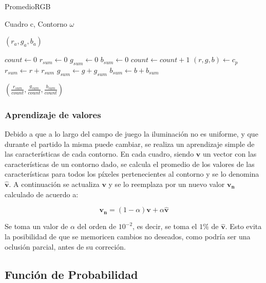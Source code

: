 \begin{algorithm}
    \caption{PromedioRGB}
    \label{alg:carac-rgb}
    \begin{algorithmic}
    \Require\hspace{\algorithmicindent}\hspace{\algorithmicindent}Cuadro c, Contorno $\omega$

    \Ensure\hspace{\algorithmicindent}\hspace{0.23cm} $(r_a, g_a, b_a)$
    \State

    \State $count \gets 0$
    \State $r_{sum} \gets 0$
    \State $g_{sum} \gets 0$
    \State $b_{sum} \gets 0$
        \State $count \gets count + 1$
        \State $(r, g, b) \gets c_{p}$
        \State $r_{sum} \gets r + r_{sum}$
        \State $g_{sum} \gets g + g_{sum}$
        \State $b_{sum} \gets b + b_{sum}$
    \EndFor

    \State \Return $ (\frac{r_{sum}}{count}, \frac{g_{sum}}{count}, \frac{b_{sum}}{count}) $
    \end{algorithmic}
\end{algorithm}


\subsubsection{Aprendizaje de valores}

Debido a que a lo largo del campo de juego la iluminación no es uniforme, y que
durante el partido la misma puede cambiar, se realiza un aprendizaje simple
de las características de cada contorno. En cada cuadro, siendo $\mathbf{v}$ un
vector con las características de un contorno dado, se calcula el promedio de
los valores de las características para todos los píxeles pertenecientes al
contorno y se lo denomina $\hat{\mathbf{v}}$. A continuación se actualiza
$\mathbf{v}$ y se lo reemplaza por un nuevo valor $\mathbf{v_n}$ calculado de
acuerdo a:

\[
  \mathbf{v_n} = \left(1-\alpha\right)\mathbf{v} + \alpha \hat{\mathbf{v}}
\]

Se toma un valor de $\alpha$ del orden de $10^{-2}$, es decir, se toma el $1\%$
de $\hat{\mathbf{v}}$. Esto evita la posibilidad de que se memoricen cambios
no deseados, como podría ser una oclusión parcial, antes de su correción.

\subsection{Función de Probabilidad}

